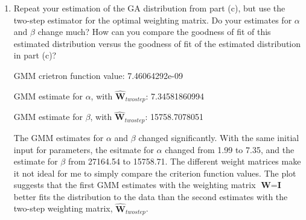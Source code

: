 \documentclass[letterpaper,12pt]{article}
\theoremstyle{definition}
\begin{document}
\begin{enumerate}
\begin{enumerate}
\item Repeat your estimation of the GA distribution from part (c), but use the two-step estimator for the optimal weighting matrix. Do your estimates for $\alpha$ and $\beta$ change much? How can you compare the goodness of fit of this estimated distribution versus the goodness of fit of the estimated distribution in part (c)?
\par
\begin{figure}[H]\centering\captionsetup{width=4.0in}
\end{figure}
\par
GMM crietron function value: 7.46064292e-09\par
GMM estimate for $\alpha$, with $\hat{\textbf{W}}_{twostep}$: 7.34581860994   \par
GMM estimate for $\beta$, with $\hat{\textbf{W}}_{twostep}$: 15758.7078051\par
\bigskip
The GMM estimates for $\alpha$ and $\beta$ changed significantly. With the same initial input for parameters, the esitmate for $\alpha$ changed from 1.99 to 7.35, and the estimate for $\beta$ from 27164.54 to 15758.71. The different weight matrices make it not ideal for me to simply compare the criterion function values. The plot suggests that the first GMM estimates with the weighting matrix $\textbf{W} = \textbf{I}$ better fits the distribution to the data than the second estimates with the two-step weighting matrix, $\hat{\textbf{W}}_{twostep}$. 
\end {enumerate}
\end {enumerate}
\end{document}
